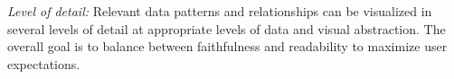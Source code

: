 \documentclass[10pt,journal,cspaper,compsoc]{IEEEtran}
\begin{document}
{\it Level of detail:} Relevant data patterns and relationships can be visualized in several levels of detail at appropriate levels of data and visual abstraction. The overall goal is to balance between faithfulness and readability to maximize user expectations.


\end{document}
